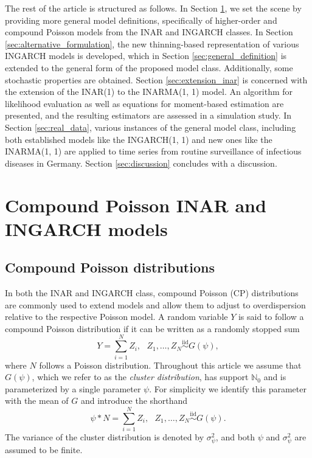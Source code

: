 \documentclass{article}
\begin{document}
The rest of the article is structured as follows. In Section \ref{sec:defintions}, we set the scene by providing more general model definitions, specifically of higher-order and compound Poisson \cite{Schweer2014, Goncalves2015} models from the INAR and INGARCH classes. In Section \ref{sec:alternative_formulation}, the new thinning-based representation of various INGARCH models is developed, which in Section \ref{sec:general_definition} is extended to the general form of the proposed model class. Additionally, some stochastic properties are obtained. Section \ref{sec:extension_inar} is concerned with the extension of the INAR(1) to the INARMA(1, 1) model. An algorithm for likelihood evaluation as well as equations for moment-based estimation are presented, and the resulting estimators are assessed in a simulation study. In Section \ref{sec:real_data}, various instances of the general model class, including both established models like the INGARCH(1, 1) and new ones like the INARMA(1, 1) are applied to time series from routine surveillance of infectious diseases in Germany. Section \ref{sec:discussion} concludes with a discussion.


\section{Compound Poisson INAR and INGARCH models}
\label{sec:defintions}

\subsection{Compound Poisson distributions}

In both the INAR and INGARCH class, compound Poisson (CP) distributions are commonly used to extend models and allow them to adjust to overdispersion relative to the respective Poisson model. A random variable $Y$ is said to follow a compound Poisson distribution \cite[Chapter 3]{Feller1968} if it can be written as a randomly stopped sum 
$$
Y = \sum_{i = 1}^N Z_i, \ \ \ Z_1, \dots, Z_N \stackrel{\text{iid}}{\sim} G(\psi),
$$
where $N$ follows a Poisson distribution. Throughout this article we assume that $G(\psi)$, which we refer to as the \textit{cluster distribution}, has support $\mathbb{N}_0$ and is parameterized by a single parameter $\psi$. For simplicity we identify this parameter with the mean of $G$ and introduce the shorthand
\begin{equation}
\psi * N = \sum_{i = 1}^N Z_i, \ \ \ Z_1, \dots, Z_N \stackrel{\text{iid}}{\sim} G(\psi). \label{eq:def_compund_thinning}
\end{equation}
The variance of the cluster distribution is denoted by $\sigma^2_\psi$, and both $\psi$ and $\sigma^2_\psi$ are assumed to be finite.
\end{document}
